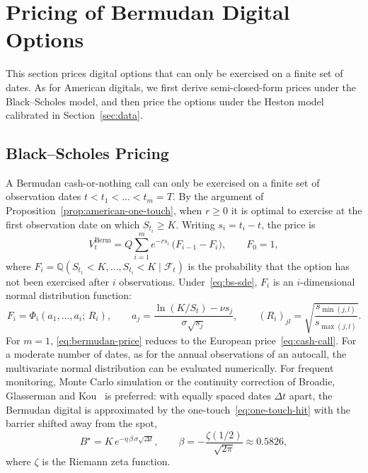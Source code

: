 \documentclass[11pt,a4paper]{article}
\theoremstyle{remark}
\begin{document}
\section{Pricing of Bermudan Digital Options}
\label{sec:bermudan}

This section prices digital options that can only be exercised on a finite set
of dates. As for American digitals, we first derive semi-closed-form prices
under the Black--Scholes model, and then price the options under the Heston
model calibrated in Section~\ref{sec:data}.




\subsection{Black--Scholes Pricing}

A Bermudan cash-or-nothing call can only be exercised on a finite set of
observation dates $t < t_1 < \dots < t_m = T$. By the argument of
Proposition~\ref{prop:american-one-touch}, when $r \geq 0$ it is optimal to
exercise at the first observation date on which $S_{t_i} \geq K$. Writing
$s_i = t_i - t$, the price is
\begin{equation}
  V^{\mathrm{Berm}}_t = Q \sum_{i=1}^{m} e^{-r s_i}\,\bigl(F_{i-1} - F_i\bigr),
  \qquad F_0 = 1,
  \label{eq:bermudan-price}
\end{equation}
where
$F_i = \mathbb{Q}\left(S_{t_1} < K, \dots, S_{t_i} < K \mid \mathcal{F}_t\right)$
is the probability that the option has not been exercised after $i$
observations. Under~\eqref{eq:bs-sde}, $F_i$ is an $i$-dimensional normal
distribution function:
\begin{equation}
  F_i = \Phi_i\left(a_1, \dots, a_i;\, R_i\right),
  \qquad
  a_j = \frac{\ln(K/S_t) - \nu s_j}{\sigma\sqrt{s_j}},
  \qquad
  (R_i)_{jl} = \sqrt{\frac{s_{\min(j,l)}}{s_{\max(j,l)}}}.
  \label{eq:bermudan-cdf}
\end{equation}
For $m=1$, \eqref{eq:bermudan-price} reduces to the European
price~\eqref{eq:cash-call}. For a moderate number of dates, as for the annual
observations of an autocall, the multivariate normal distribution can be
evaluated numerically. For frequent monitoring, Monte Carlo simulation or the
continuity correction of Broadie, Glasserman and Kou~\cite{BroadieGlassermanKou1997}
is preferred: with equally spaced dates $\Delta t$ apart, the Bermudan digital
is approximated by the one-touch~\eqref{eq:one-touch-hit} with the barrier
shifted away from the spot,
\begin{equation}
  B^{\star} = K\,e^{-\eta\,\beta\,\sigma\sqrt{\Delta t}},
  \qquad
  \beta = -\frac{\zeta(1/2)}{\sqrt{2\pi}} \approx 0.5826,
  \label{eq:bgk}
\end{equation}
where $\zeta$ is the Riemann zeta function.
\end{document}

